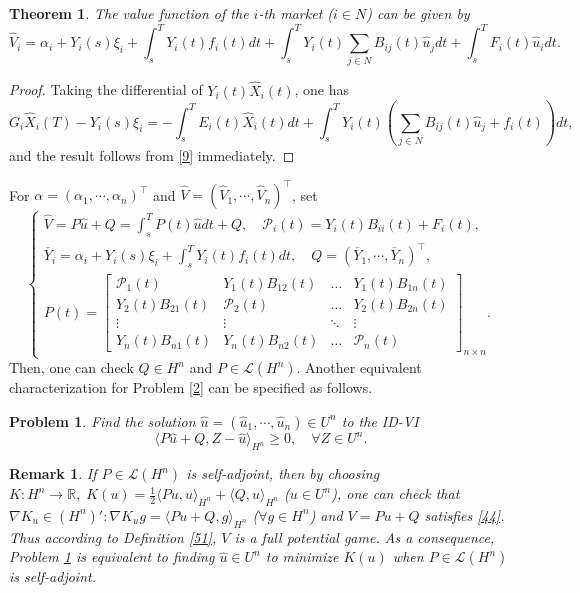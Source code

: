\documentclass[10pt]{article}
\newtheorem{thm}{Theorem}[section]
\newtheorem{prob}{Problem}[section]
\newtheorem{remark}{Remark}[section]
\begin{document}
\begin{thm}
The value function of  the $i$-th market ($i\in N$) can be given by
\begin{equation}\label{60}
\widehat{V}_i=\alpha_i+Y_i(s)\xi_i+\int_s^TY_i(t)f_i(t)dt+\int_s^TY_i(t)\sum_{j\in N}B_{ij}(t)\widehat{u}_jdt+\int_s^TF_i(t)\widehat{u}_i dt.
\end{equation}
\end{thm}
\begin{proof}
Taking the differential of $Y_i(t)\widehat{X}_{i}(t)$, one has
$$
G_i\widehat{X}_{i}(T)-Y_i(s)\xi_i
=-\int_s^TE_i(t)\widehat{X}_{i}(t)dt+\int_s^TY_i(t)(\sum_{j\in N}B_{ij}(t)\widehat{u}_j+f_i(t))dt,
$$
and the result follows from \eqref{9} immediately.
\end{proof}
For $\alpha=(\alpha_1,\cdots,\alpha_n)^{\top}$ and $\widehat{V}=(\widehat{V}_1,\cdots,\widehat{V}_n)^{\top}$, set
\begin{equation}\label{15}
\begin{cases}
\widehat{V}=P\widehat{u}+Q=\int_s^TP(t)\widehat{u}dt+Q,\quad \mathcal{P}_i(t)=Y_i(t)B_{ii}(t)+F_i(t),\\
\overline{Y}_i=\alpha_i+Y_{i}(s)\xi_{i}+\int_s^TY_{i}(t)f_{i}(t)dt,\quad Q=(\overline{Y}_1,\cdots,\overline{Y}_n)^{\top},\\
P(t)=\begin{bmatrix}
\mathcal{P}_1(t)& Y_1(t)B_{12}(t)&\dots & Y_1(t)B_{1n}(t)\\
  Y_2(t)B_{21}(t)& \mathcal{P}_2(t)&\dots & Y_2(t)B_{2n}(t)\\
\vdots &\vdots & \ddots&\vdots\\
Y_n(t)B_{n1}(t)&Y_n(t)B_{n2}(t)&\dots & \mathcal{P}_n(t)
\end{bmatrix}_{n \times n}.
\end{cases}
\end{equation}
Then, one can check $Q\in H^n$ and $P\in \mathcal{L}(H^n)$. Another equivalent characterization for  Problem \ref{2} can be specified as follows.

\begin{prob}\label{12}
Find the solution $\widehat{u}=(\widehat{u}_1,\cdots,\widehat{u}_n)\in U^n$ to the ID-VI
\begin{equation}\label{10}
\langle P\widehat{u}+Q,Z-\widehat{u}\rangle_{H^n}\geq 0,\quad \forall Z\in U^{n}.
\end{equation}
\end{prob}
\begin{remark}\label{55}
If $P\in \mathcal{L}(H^n)$ is self-adjoint, then by choosing $K:H^n\rightarrow \mathbb{R},\;K(u)=\frac{1}{2}\langle Pu,u\rangle_{H^n}+\langle Q,u\rangle_{H^n}$ ($u\in U^n$), one can check that $\nabla K_u\in (H^n)':\nabla K_ug=\langle Pu+Q,g\rangle_{H^n}$ ($\forall g\in H^n$) and $V=Pu+Q$ satisfies \eqref{44}. Thus according to Definition \ref{51}, $V$ is a full potential game. As a consequence, Problem \ref{12} is equivalent to finding $\widehat{u}\in U^n$ to minimize $K(u)$ when $P\in \mathcal{L}(H^n)$ is self-adjoint.
\end{remark}
\end{document}
